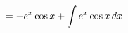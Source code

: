 \documentclass[preview]{standalone}
\begin{document}
\begin{align*}
\special{dvisvgm:raw <g id='unique000'>}= -e^x \cos x + \int e^x \cos x \, dx\special{dvisvgm:raw </g>}
\end{align*}
\end{document}
